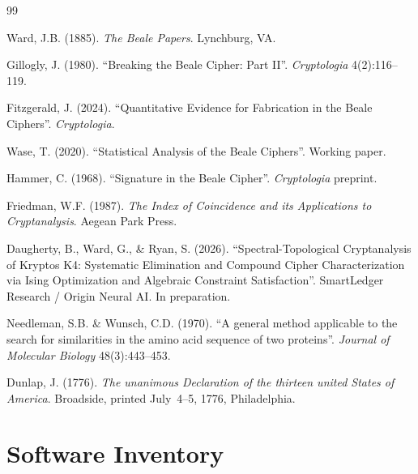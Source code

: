\documentclass[11pt,a4paper]{article}
\begin{document}
\begin{thebibliography}{99}

Ward, J.B. (1885).
\textit{The Beale Papers}.
Lynchburg, VA.

Gillogly, J. (1980).
``Breaking the Beale Cipher: Part II''.
\textit{Cryptologia} 4(2):116--119.

Fitzgerald, J. (2024).
``Quantitative Evidence for Fabrication in the Beale Ciphers''.
\textit{Cryptologia}.

Wase, T. (2020).
``Statistical Analysis of the Beale Ciphers''.
Working paper.

Hammer, C. (1968).
``Signature in the Beale Cipher''.
\textit{Cryptologia} preprint.

Friedman, W.F. (1987).
\textit{The Index of Coincidence and its Applications to Cryptanalysis}.
Aegean Park Press.

Daugherty, B., Ward, G., \& Ryan, S. (2026).
``Spectral-Topological Cryptanalysis of Kryptos K4:
Systematic Elimination and Compound Cipher Characterization
via Ising Optimization and Algebraic Constraint Satisfaction''.
SmartLedger Research / Origin Neural AI. In preparation.

Needleman, S.B. \& Wunsch, C.D. (1970).
``A general method applicable to the search for similarities
in the amino acid sequence of two proteins''.
\textit{Journal of Molecular Biology} 48(3):443--453.

Dunlap, J. (1776).
\textit{The unanimous Declaration of the thirteen united States of America}.
Broadside, printed July~4--5, 1776, Philadelphia.

\end{thebibliography}

\appendix
\section{Software Inventory}
\end{document}
